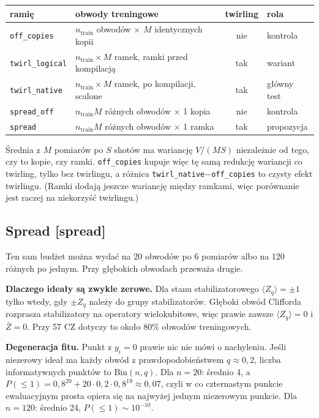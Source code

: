 \documentclass[11pt,a4paper]{article}
\newcommand{\slid}[1]{\hfill{\normalfont\small\ttfamily\color{axbluedk}[#1]}}
\newcommand{\ev}[1]{\langle #1\rangle}
\begin{document}
\begin{center}
\begin{tabular}{@{}llcl@{}}
\toprule
ramię & obwody treningowe & twirling & rola \\
\midrule
\texttt{off\_copies} & $n_{\text{train}}$ obwodów $\times$ $M$ identycznych kopii & nie & kontrola \\
\texttt{twirl\_logical} & $n_{\text{train}}\times M$ ramek, ramki przed kompilacją & tak & wariant \\
\texttt{twirl\_native} & $n_{\text{train}}\times M$ ramek, po kompilacji, scalone & tak & główny test \\
\texttt{spread\_off} & $n_{\text{train}}M$ różnych obwodów $\times$ 1 kopia & nie & kontrola \\
\texttt{spread} & $n_{\text{train}}M$ różnych obwodów $\times$ 1 ramka & tak & propozycja \\
\bottomrule
\end{tabular}
\end{center}

Średnia z $M$ pomiarów po $S$ shotów ma wariancję $V/(MS)$ niezależnie od tego, czy to kopie, czy
ramki. \texttt{off\_copies} kupuje więc tę samą redukcję wariancji co twirling, tylko bez
twirlingu, a różnica \texttt{twirl\_native}$-$\texttt{off\_copies} to czysty efekt twirlingu.
(Ramki dodają jeszcze wariancję między ramkami, więc porównanie jest raczej na niekorzyść
twirlingu.)

\subsection{Spread \slid{spread}}

Ten sam budżet można wydać na 20 obwodów po 6 pomiarów albo na 120 różnych po jednym. Przy
głębokich obwodach przeważa drugie.

\textbf{Dlaczego ideały są zwykle zerowe.} Dla stanu stabilizatorowego $\ev{Z_q}=\pm1$ tylko wtedy,
gdy $\pm Z_q$ należy do grupy stabilizatorów. Głęboki obwód Clifforda rozprasza stabilizatory na
operatory wielokubitowe, więc prawie zawsze $\ev{Z_q}=0$ i $\bar Z=0$. Przy 57 CZ dotyczy to
około 80\% obwodów treningowych.

\textbf{Degeneracja fitu.} Punkt z $y_i=0$ prawie nic nie mówi o nachyleniu. Jeśli niezerowy ideał
ma każdy obwód z prawdopodobieństwem $q\approx0{,}2$, liczba informatywnych punktów to
$\mathrm{Bin}(n,q)$. Dla $n=20$: średnio 4, a
$P(\le1)=0{,}8^{20}+20\cdot0{,}2\cdot0{,}8^{19}\approx0{,}07$, czyli w co czternastym punkcie
ewaluacyjnym prosta opiera się na najwyżej jednym niezerowym punkcie. Dla $n=120$: średnio 24,
$P(\le1)\sim10^{-10}$.
\end{document}
